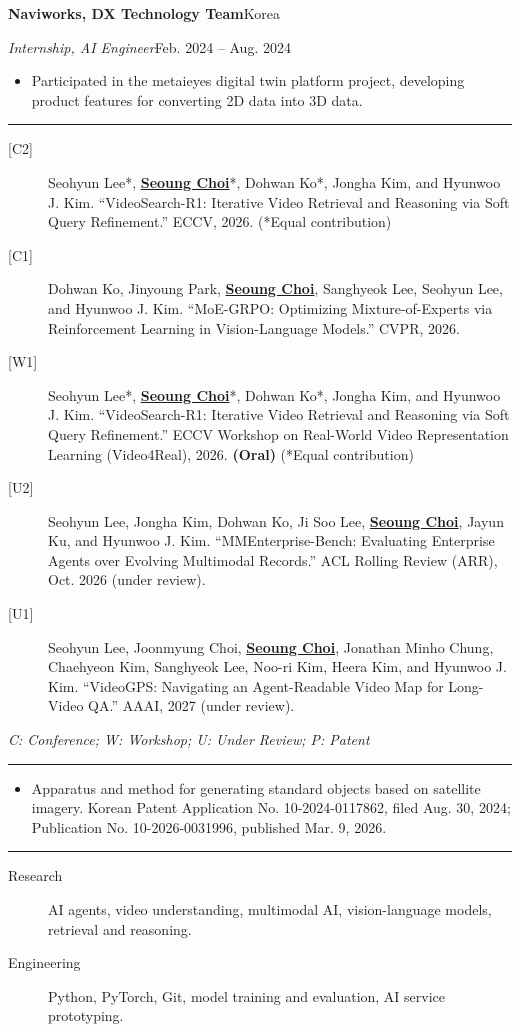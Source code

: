 \documentclass[10pt]{article}
\newcommand{\cvsection}[1]{%
  \vspace{0.55em}
  \noindent{\large\bfseries\MakeUppercase{#1}}\par
  \vspace{0.15em}
  \hrule
  \vspace{0.35em}
}
\newcommand{\cventry}[4]{%
  \noindent\textbf{#1}\hfill #2\par
  \noindent\textit{#3}\hfill #4\par
}
\begin{document}
\cventry{Naviworks, DX Technology Team}{Korea}{Internship, AI Engineer}{Feb. 2024 -- Aug. 2024}
\begin{itemize}
  \item Participated in the metaieyes digital twin platform project, developing product features for converting 2D data into 3D data.
\end{itemize}

\cvsection{Publications}
\begin{description}
  \item[\textnormal{[C2]}] Seohyun Lee*, \textbf{\underline{Seoung Choi}}*, Dohwan Ko*, Jongha Kim, and Hyunwoo J. Kim. ``VideoSearch-R1: Iterative Video Retrieval and Reasoning via Soft Query Refinement.'' ECCV, 2026. (*Equal contribution)
  \item[\textnormal{[C1]}] Dohwan Ko, Jinyoung Park, \textbf{\underline{Seoung Choi}}, Sanghyeok Lee, Seohyun Lee, and Hyunwoo J. Kim. ``MoE-GRPO: Optimizing Mixture-of-Experts via Reinforcement Learning in Vision-Language Models.'' CVPR, 2026.
  \item[\textnormal{[W1]}] Seohyun Lee*, \textbf{\underline{Seoung Choi}}*, Dohwan Ko*, Jongha Kim, and Hyunwoo J. Kim. ``VideoSearch-R1: Iterative Video Retrieval and Reasoning via Soft Query Refinement.'' ECCV Workshop on Real-World Video Representation Learning (Video4Real), 2026. \textbf{(Oral)} (*Equal contribution)
  \item[\textnormal{[U2]}] Seohyun Lee, Jongha Kim, Dohwan Ko, Ji Soo Lee, \textbf{\underline{Seoung Choi}}, Jayun Ku, and Hyunwoo J. Kim. ``MMEnterprise-Bench: Evaluating Enterprise Agents over Evolving Multimodal Records.'' ACL Rolling Review (ARR), Oct. 2026 (under review).
  \item[\textnormal{[U1]}] Seohyun Lee, Joonmyung Choi, \textbf{\underline{Seoung Choi}}, Jonathan Minho Chung, Chaehyeon Kim, Sanghyeok Lee, Noo-ri Kim, Heera Kim, and Hyunwoo J. Kim. ``VideoGPS: Navigating an Agent-Readable Video Map for Long-Video QA.'' AAAI, 2027 (under review).
\end{description}
\noindent\small\textit{C: Conference; W: Workshop; U: Under Review; P: Patent}\normalsize

\cvsection{Patent}
\begin{itemize}
  \item[\textnormal{[P1]}] Apparatus and method for generating standard objects based on satellite imagery. Korean Patent Application No. 10-2024-0117862, filed Aug. 30, 2024; Publication No. 10-2026-0031996, published Mar. 9, 2026.
\end{itemize}

\cvsection{Skills}
\begin{description}
  \item[Research] AI agents, video understanding, multimodal AI, vision-language models, retrieval and reasoning.
  \item[Engineering] Python, PyTorch, Git, model training and evaluation, AI service prototyping.
\end{description}
\end{document}
